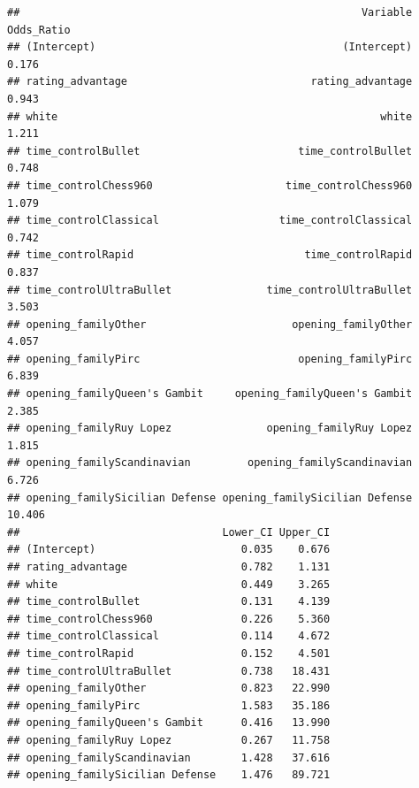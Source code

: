 \documentclass[
]{article}
\begin{document}
\begin{verbatim}
##                                                      Variable Odds_Ratio
## (Intercept)                                       (Intercept)      0.176
## rating_advantage                             rating_advantage      0.943
## white                                                   white      1.211
## time_controlBullet                         time_controlBullet      0.748
## time_controlChess960                     time_controlChess960      1.079
## time_controlClassical                   time_controlClassical      0.742
## time_controlRapid                           time_controlRapid      0.837
## time_controlUltraBullet               time_controlUltraBullet      3.503
## opening_familyOther                       opening_familyOther      4.057
## opening_familyPirc                         opening_familyPirc      6.839
## opening_familyQueen's Gambit     opening_familyQueen's Gambit      2.385
## opening_familyRuy Lopez               opening_familyRuy Lopez      1.815
## opening_familyScandinavian         opening_familyScandinavian      6.726
## opening_familySicilian Defense opening_familySicilian Defense     10.406
##                                Lower_CI Upper_CI
## (Intercept)                       0.035    0.676
## rating_advantage                  0.782    1.131
## white                             0.449    3.265
## time_controlBullet                0.131    4.139
## time_controlChess960              0.226    5.360
## time_controlClassical             0.114    4.672
## time_controlRapid                 0.152    4.501
## time_controlUltraBullet           0.738   18.431
## opening_familyOther               0.823   22.990
## opening_familyPirc                1.583   35.186
## opening_familyQueen's Gambit      0.416   13.990
## opening_familyRuy Lopez           0.267   11.758
## opening_familyScandinavian        1.428   37.616
## opening_familySicilian Defense    1.476   89.721
\end{verbatim}
\end{document}

